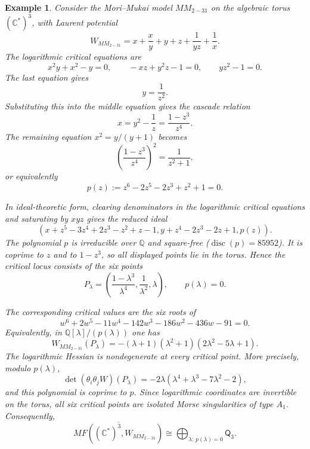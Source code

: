 \documentclass[11pt]{amsart}
\newtheorem{example}{Example}[section]
\newcommand{\MorseCat}[1]{\mathsf{Q}_{#1}}
\begin{document}
\begin{example}
Consider the Mori--Mukai model $MM_{2-31}$ on the algebraic torus
$(\mathbb{C}^*)^3$, with Laurent potential
\[
W_{MM_{2-31}}=x+\frac{x}{y}+y+z+\frac{1}{yz}+\frac{1}{x}.
\]
The logarithmic critical equations are
\[
x^2y+x^2-y=0,
\qquad
-xz+y^2z-1=0,
\qquad
yz^2-1=0.
\]
The last equation gives
\[
y=\frac{1}{z^2}.
\]
Substituting this into the middle equation gives the cascade relation
\[
x=y^2-\frac{1}{z}=\frac{1-z^3}{z^4}.
\]
The remaining equation $x^2=y/(y+1)$ becomes
\[
\left(\frac{1-z^3}{z^4}\right)^2=\frac{1}{z^2+1},
\]
or equivalently
\[
p(z):=z^6-2z^5-2z^3+z^2+1=0.
\]

In ideal-theoretic form, clearing denominators in the logarithmic critical
equations and saturating by $xyz$ gives the reduced ideal
\[
\left(
x+z^5-3z^4+2z^3-z^2+z-1,
y+z^4-2z^3-2z+1,
p(z)
\right).
\]
The polynomial $p$ is irreducible over $\mathbb{Q}$ and square-free
($\operatorname{disc}(p)=85952$). It is coprime to $z$ and to $1-z^3$, so all
displayed points lie in the torus. Hence the critical locus consists of the
six points
\[
P_{\lambda}=\left(
\frac{1-\lambda^3}{\lambda^4},
\frac{1}{\lambda^2},
\lambda
\right),
\qquad
p(\lambda)=0.
\]

The corresponding critical values are the six roots of
\[
w^6+2w^5-11w^4-142w^3-186w^2-436w-91=0.
\]
Equivalently, in $\mathbb{Q}[\lambda]/(p(\lambda))$ one has
\[
W_{MM_{2-31}}(P_{\lambda})
=-(\lambda+1)(\lambda^2+1)(2\lambda^2-5\lambda+1).
\]
The logarithmic Hessian is nondegenerate at every critical point. More
precisely, modulo $p(\lambda)$,
\[
\det(\theta_i\theta_jW)(P_{\lambda})
=-2\lambda(\lambda^4+\lambda^3-7\lambda^2-2),
\]
and this polynomial is coprime to $p$. Since logarithmic coordinates are
invertible on the torus, all six critical points are isolated Morse
singularities of type $A_1$. Consequently,
\[
\overline{MF((\mathbb{C}^*)^3,W_{MM_{2-31}})}
\cong \bigoplus_{\lambda:\,p(\lambda)=0}\MorseCat{3}.
\]
\end{example}
\end{document}
